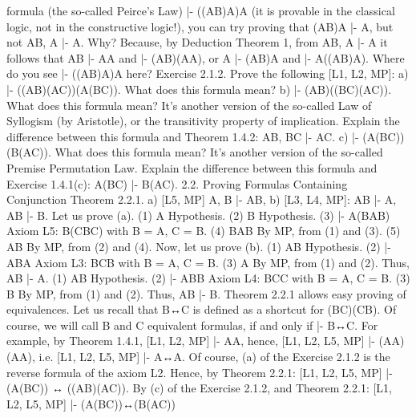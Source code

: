 formula (the so-called Peirce's Law) |- ((A\IMPLIES B)\IMPLIES A)\IMPLIES A (it is provable in the classical logic, not in the
constructive logic!), you can try proving that (A\IMPLIES B)\IMPLIES A |- A, but not A\IMPLIES B, A |- A. Why? Because, by
Deduction Theorem 1, from A\IMPLIES B, A |- A it follows that A\IMPLIES B |- A\IMPLIES A and |- (A\IMPLIES B)\IMPLIES (A\IMPLIES A), or A |-
(A\IMPLIES B)\IMPLIES A and |- A\IMPLIES ((A\IMPLIES B)\IMPLIES A). Where do you see |- ((A\IMPLIES B)\IMPLIES A)\IMPLIES A here?
Exercise 2.1.2. Prove the following [L1, L2, MP]:
a) |- ((A\IMPLIES B)\IMPLIES (A\IMPLIES C))\IMPLIES (A\IMPLIES (B\IMPLIES C)). What does this formula mean?
b) |- (A\IMPLIES B)\IMPLIES ((B\IMPLIES C)\IMPLIES (A\IMPLIES C)). What does this formula mean? It's another version of the so-called
Law of Syllogism (by Aristotle), or the transitivity property of implication. Explain the difference
between this formula and Theorem 1.4.2: A\IMPLIES B, B\IMPLIES C |- A\IMPLIES C.
c) |- (A\IMPLIES (B\IMPLIES C))\IMPLIES (B\IMPLIES (A\IMPLIES C)). What does this formula mean? It's another version of the so-called
Premise Permutation Law. Explain the difference between this formula and Exercise 1.4.1(c):
A\IMPLIES (B\IMPLIES C) |- B\IMPLIES (A\IMPLIES C).
2.2. Proving Formulas Containing Conjunction
Theorem 2.2.1. a) [L5, MP] A, B |- A\AND B,
b) [L3, L4, MP]: A\AND B |- A, A\AND B |- B.
Let us prove (a).
(1) A Hypothesis.
(2) B Hypothesis.
(3) |- A\IMPLIES (B\IMPLIES A\AND B) Axiom L5: B\IMPLIES (C\IMPLIES B\AND C) with B = A, C =
                        B.
(4) B\IMPLIES A\AND B By MP, from (1) and (3).
(5) A\AND B By MP, from (2) and (4).
Now, let us prove (b).
(1) A\AND B Hypothesis.
(2) |- A\AND B\IMPLIES A Axiom L3: B\AND C\IMPLIES B with B = A, C = B.
(3) A By MP, from (1) and (2).
Thus, A\AND B |- A.
(1) A\AND B Hypothesis.
(2) |- A\AND B\IMPLIES B Axiom L4: B\AND C\IMPLIES C with B = A, C = B.
(3) B By MP, from (1) and (2).
Thus, A\AND B |- B.
Theorem 2.2.1 allows easy proving of equivalences. Let us recall that B↔C is defined as a shortcut for
(B\IMPLIES C)\AND (C\IMPLIES B). Of course, we will call B and C equivalent formulas, if and only if |- B↔C. For
example, by Theorem 1.4.1, [L1, L2, MP] |- A\IMPLIES A, hence, [L1, L2, L5, MP] |- (A\IMPLIES A)\AND (A\IMPLIES A), i.e.
[L1, L2, L5, MP] |- A↔A.
Of course, (a) of the Exercise 2.1.2 is the reverse formula of the axiom L2. Hence, by Theorem 2.2.1:
[L1, L2, L5, MP] |- (A\IMPLIES (B\IMPLIES C)) ↔ ((A\IMPLIES B)\IMPLIES (A\IMPLIES C)).
By (c) of the Exercise 2.1.2, and Theorem 2.2.1:
[L1, L2, L5, MP] |- (A\IMPLIES (B\IMPLIES C))↔(B\IMPLIES (A\IMPLIES C))
